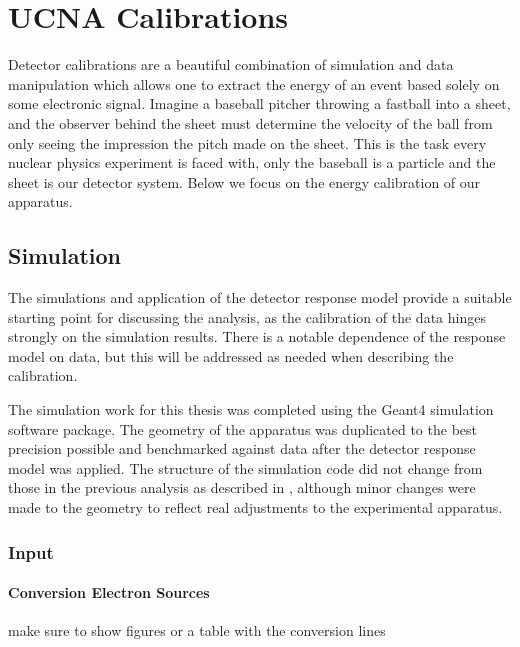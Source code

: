 \chapter{UCNA Calibrations}
\label{ch:UCNA_Calibrations}

Detector calibrations are a beautiful combination
of simulation and data manipulation which allows one to extract the energy of
an event based solely on some electronic signal. Imagine a baseball pitcher
throwing a fastball into a sheet, and the observer behind the sheet must
determine the velocity of the ball from only seeing the impression the pitch
made on the sheet. This is the task every nuclear physics experiment is faced
with, only the baseball is a particle and the sheet is our detector system.
Below we focus on the energy calibration of our apparatus.


\section{Simulation}
\label{sec:Simulation}

The simulations and application of the
detector response model provide a suitable starting
point for discussing the analysis, as the calibration of the data hinges
strongly on the simulation results. There is a notable dependence of the
response model on data, but this will be addressed as needed
when describing the calibration.

The simulation work for this thesis was completed
using the Geant4 simulation software package. The geometry of the
apparatus was duplicated
to the best precision possible and benchmarked against data after
the detector response model was applied. The structure
of the simulation code did not change from those in the previous analysis
as described in \cite{mpmThesis}, although minor changes were
made to the geometry to reflect real adjustments to the experimental
apparatus. 

\subsection{Input}
\subsubsection{Conversion Electron Sources}
make sure to show figures or a table with the conversion lines
